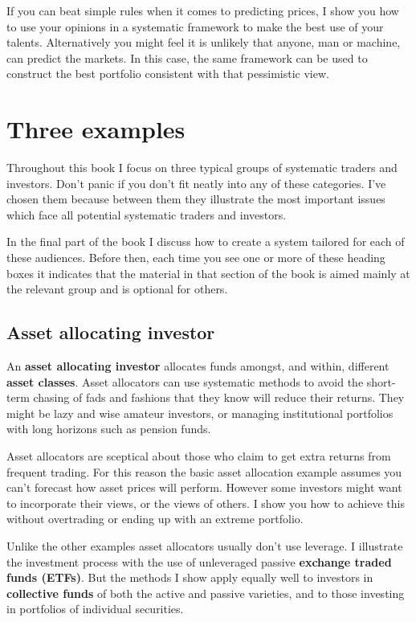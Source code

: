 If you can beat simple rules when it comes to predicting prices, I show you how to use your opinions in a systematic framework to make the best use of your talents. Alternatively you might feel it is unlikely that anyone, man or machine, can predict the markets. In this case, the same framework can be used to construct the best portfolio consistent with that pessimistic view.

\section*{Three examples}

Throughout this book I focus on three typical groups of systematic traders and investors. Don't panic if you don't fit neatly into any of these categories. I've chosen them because between them they illustrate the most important issues which face all potential systematic traders and investors.

In the final part of the book I discuss how to create a system tailored for each of these audiences. Before then, each time you see one or more of these heading boxes it indicates that the material in that section of the book is aimed mainly at the relevant group and is optional for others.

\subsection*{Asset allocating investor}

An \textbf{asset allocating investor} allocates funds amongst, and within, different \textbf{asset classes}. Asset allocators can use systematic methods to avoid the short-term chasing of fads and fashions that they know will reduce their returns. They might be lazy and wise amateur investors, or managing institutional portfolios with long horizons such as pension funds.

Asset allocators are sceptical about those who claim to get extra returns from frequent trading. For this reason the basic asset allocation example assumes you can't forecast how asset prices will perform. However some investors might want to incorporate their views, or the views of others. I show you how to achieve this without overtrading or ending up with an extreme portfolio.

Unlike the other examples asset allocators usually don't use leverage. I illustrate the investment process with the use of unleveraged passive \textbf{exchange traded funds (ETFs)}. But the methods I show apply equally well to investors in \textbf{collective funds} of both the active and passive varieties, and to those investing in portfolios of individual securities.

